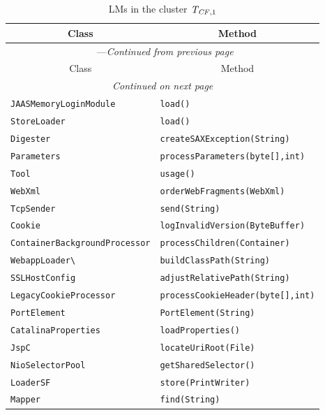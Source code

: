 \begin{center}
\begin{longtable}{ll}
\caption{LMs in the cluster $\mathit{T}_{\mathit{CF},1}$}\\
\toprule\multicolumn{1}{c}{Class}&\multicolumn{1}{c}{Method}\\\midrule
\endfirsthead

\multicolumn{2}{c}{\tablename\ \thetable{}---\textit{Continued from previous page}} \\\midrule
\multicolumn{1}{c}{Class}&\multicolumn{1}{c}{Method}\\\midrule
\endhead
\multicolumn{2}{c}{\textit{Continued on next page}}\\\midrule
\endfoot
\bottomrule
\endlastfoot

\lstinline/JAASMemoryLoginModule/&{\lstinline/load()/}\\
\lstinline/StoreLoader/&{\lstinline/load()/}\\
\lstinline/Digester/&{\lstinline/createSAXException(String)/}\\
\lstinline/Parameters/&{\lstinline/processParameters(byte[],int)/}\\
\lstinline/Tool/&{\lstinline/usage()/}\\
\lstinline/WebXml/&{\lstinline/orderWebFragments(WebXml)/}\\
\lstinline/TcpSender/&{\lstinline/send(String)/}\\
\lstinline/Cookie/&{\lstinline/logInvalidVersion(ByteBuffer)/}\\
\lstinline/ContainerBackgroundProcessor/&{\lstinline/processChildren(Container)/}\\
\lstinline/WebappLoader\/&{\lstinline/buildClassPath(String)/}\\
\lstinline/SSLHostConfig/&{\lstinline/adjustRelativePath(String)/}\\
\lstinline/LegacyCookieProcessor/&{\lstinline/processCookieHeader(byte[],int)/}\\
\lstinline/PortElement/&{\lstinline/PortElement(String)/}\\
\lstinline/CatalinaProperties/&{\lstinline/loadProperties()/}\\
\lstinline/JspC/&{\lstinline/locateUriRoot(File)/}\\
\lstinline/NioSelectorPool/&{\lstinline/getSharedSelector()/}\\
\lstinline/LoaderSF/&{\lstinline/store(PrintWriter)/}\\
\lstinline/Mapper/&{\lstinline/find(String)/}\\

\end{longtable}
\end{center}
